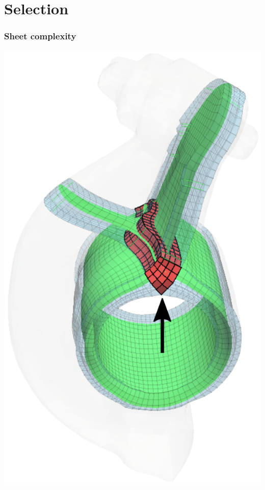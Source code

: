 \documentclass[12pt]{beamer}
\begin{document}
\begin{frame}[fragile]
\begin{center}
  \end{center}
\end{frame}

\section{Selection}

\begin{frame}
  \frametitle{Sheet complexity}
  \begin{center}
    \includegraphics[height=0.8\textheight]{./images/self-intersect.png}
  \end{center}
\end{frame}
\end{document}
